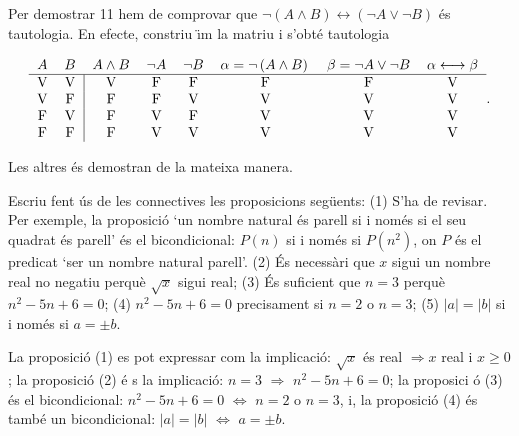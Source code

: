 Per demostrar 11 hem de comprovar que $\lnot(A\wedge B)\longleftrightarrow
\left( \lnot A\vee\lnot B\right) $ \'{e}s tautologia. En efecte, constriu%
\"{\i}m la matriu i s'obt\'{e} tautologia

\begin{equation*}
\begin{tabular}{llllllll}
$A$ & $B$ & $A\wedge B$ & $\lnot A$ & $\lnot B$ & $\alpha=\lnot\left(
A\wedge B\right) \,$ & $\beta=\lnot A\vee\lnot B$ & $\alpha%
\longleftrightarrow\beta $ \\ \hline
\multicolumn{1}{c}{V} & \multicolumn{1}{c|}{V} & \multicolumn{1}{c}{V} &
\multicolumn{1}{c}{F} & \multicolumn{1}{c}{F} & \multicolumn{1}{c}{F} &
\multicolumn{1}{c}{F} & \multicolumn{1}{c}{V} \\
\multicolumn{1}{c}{V} & \multicolumn{1}{c|}{F} & \multicolumn{1}{c}{F} &
\multicolumn{1}{c}{F} & \multicolumn{1}{c}{V} & \multicolumn{1}{c}{V} &
\multicolumn{1}{c}{V} & \multicolumn{1}{c}{V} \\
\multicolumn{1}{c}{F} & \multicolumn{1}{c|}{V} & \multicolumn{1}{c}{F} &
\multicolumn{1}{c}{V} & \multicolumn{1}{c}{F} & \multicolumn{1}{c}{V} &
\multicolumn{1}{c}{V} & \multicolumn{1}{c}{V} \\
\multicolumn{1}{c}{F} & \multicolumn{1}{c|}{F} & \multicolumn{1}{c}{F} &
\multicolumn{1}{c}{V} & \multicolumn{1}{c}{V} & \multicolumn{1}{c}{V} &
\multicolumn{1}{c}{V} & \multicolumn{1}{c}{V}%
\end{tabular}
.
\end{equation*}

Les altres \'{e}s demostran de la mateixa manera.

\begin{exemple}
Escriu fent \'{u}s de les connectives les proposicions seg\"{u}ents: (1)
S'ha de revisar. Per exemple, la proposici\'{o} `un nombre natural \'{e}s
parell si i nom\'{e}s si el seu quadrat \'{e}s parell' \'{e}s el
bicondicional: $P(n)$ si i nom\'{e}s si $P(n^{2})$, on $P$ \'{e}s el predicat
`ser un nombre natural parell'. (2) \'{E}s necess\`{a}ri que $x$ sigui un
nombre real no negatiu perqu\`{e} $\sqrt{x}$ sigui real; (3) \'{E}s
suficient que $n=3$ perqu\`{e} $n^{2}-5n+6=0$; (4) $n^{2}-5n+6=0$
precisament si $n=2$ o $n=3$; (5) $\left\vert a\right\vert =\left\vert
b\right\vert $ si i nom\'{e}s si $a=\pm b$.
\end{exemple}

\begin{solucio}
La proposici\'{o} (1) es pot expressar com la implicaci\'{o}: $\sqrt{x}$
\'{e}s real $\Longrightarrow x$ real i $x\geq0$; la proposici\'{o} (2) \'{e}%
s la implicaci\'{o}: $n=3$ $\Longrightarrow$ $n^{2}-5n+6=0$; la proposici%
\'{o} (3) \'{e}s el bicondicional: $n^{2}-5n+6=0$ $\Longleftrightarrow$ $n=2
$ o $n=3$, i, la proposici\'{o} (4) \'{e}s tamb\'{e} un bicondicional: $%
\left\vert a\right\vert =\left\vert b\right\vert $ $\Longleftrightarrow$ $%
a=\pm b$.
\end{solucio}

